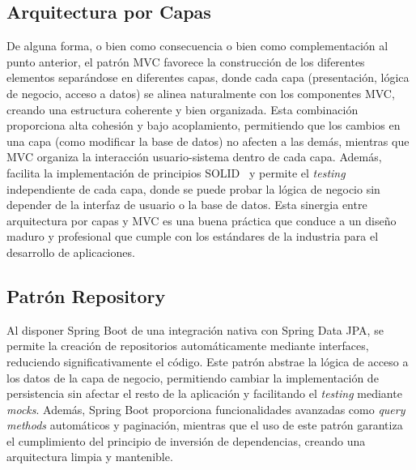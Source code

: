 \subsection{Arquitectura por Capas}\label{arquitectura-por-capas}
De alguna forma, o bien como consecuencia o bien como complementación al punto anterior, el patrón MVC favorece la construcción de los diferentes elementos separándose en diferentes capas, donde cada capa (presentación, lógica de negocio, acceso a datos) se alinea naturalmente con los componentes MVC, creando una estructura coherente y bien organizada. Esta combinación proporciona alta cohesión y bajo acoplamiento, permitiendo que los cambios en una capa (como modificar la base de datos) no afecten a las demás, mientras que MVC organiza la interacción usuario-sistema dentro de cada capa. Además, facilita la implementación de principios SOLID~\cite{solid} y permite el \emph{testing} independiente de cada capa, donde se puede probar la lógica de negocio sin depender de la interfaz de usuario o la base de datos. Esta sinergia entre arquitectura por capas y MVC es una buena práctica que conduce a un diseño maduro y profesional que cumple con los estándares de la industria para el desarrollo de aplicaciones.

\subsection{Patrón Repository}\label{patron-repository}
Al disponer Spring Boot de una integración nativa con Spring Data JPA, se permite la creación de repositorios automáticamente mediante interfaces, reduciendo significativamente el código. Este patrón abstrae la lógica de acceso a los datos de la capa de negocio, permitiendo cambiar la implementación de persistencia sin afectar el resto de la aplicación y facilitando el \emph{testing} mediante \emph{mocks}. Además, Spring Boot proporciona funcionalidades avanzadas como \emph{query methods} automáticos y paginación, mientras que el uso de este patrón garantiza el cumplimiento del principio de inversión de dependencias, creando una arquitectura limpia y mantenible.

